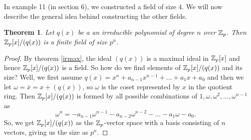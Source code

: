 \documentclass[12pt]{article}
\theoremstyle{plain}
\newtheorem{theorem}{Theorem}
\theoremstyle{definition}
\theoremstyle{remark}
\begin{document}
In example 11 (in section 6), we constructed a field of size $4$. We will now describe the general idea behind constructing the other fields. 
\begin{theorem}
Let $q(x)$ be a an irreducible polynomial of degree $n$ over $\mathbb{Z}_p$. Then $\mathbb{Z}_p[x]/(q(x))$ is a finite field of size $p^n$.
\end{theorem}
\begin{proof}
By theorem \ref{irmax}, the ideal $(q(x))$ is a maximal ideal in $\mathbb{Z}_p[x]$ and hence $\mathbb{Z}_p[x]/(q(x))$ is a field. So how do we find elements of $\mathbb{Z}_p[x]/(q(x))$ and its size? Well, we first assume $q(x)=x^n+a_{n-1}x^{n-1}+\dots +a_1x+a_0$ and then we let $\omega=\overline{x}=x+(q(x))$, so $\omega$ is the coset represented by $x$ in the quotient ring. Then $\mathbb{Z}_p[x]/(q(x))$ is formed by all possible combinations of $1, \omega, \omega^2, \dots, \omega^{n-1}$ as 
$$\omega^n=-a_{n-1}\omega^{n-1}-a_{n-2}\omega^{n-2}-\dots -a_1\omega-a_0.$$
So, we get $\mathbb{Z}_p[x]/(q(x))$ as the $\mathbb{Z}_p$-vector space with a basis consisting of $n$ vectors, giving us the size as $p^n$.
\end{proof}
\end{document}
